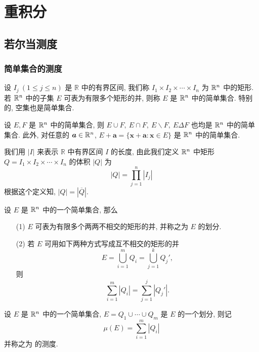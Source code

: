 \newpage
\chapter{重积分}

\section{若尔当测度}

\subsection{简单集合的测度}

\begin{definition}
	设 $I_j\ (1 \leqslant j \leqslant n)$ 是 $\mathbb R$ 中的有界区间, 我们称 $I_1\times I_2\times\cdots \times I_n$ 为 $\mathbb {R}^{n}$ 中的矩形. 若 $\mathbb {R}^{n}$ 中的子集 $E$ 可表为有限多个矩形的并, 则称 $E$ 是 $\mathbb {R}^{n}$ 中的简单集合. 特别的, 空集也是简单集合.
\end{definition}

\begin{proposition}
	设 $E,F$ 是 $\mathbb {R}^{n}$ 中的简单集合, 则 $E\cup F,\ E \cap F, \ E\backslash F,\ E\Delta F$ 也均是 $\mathbb {R}^{n}$ 中的简单集合. 此外, 对任意的 $\bm a \in \mathbb {R}^{n}$, $E+\bm a=\{\bm x +\bm a:\bm x \in E\}$ 是 $\mathbb {R}^{n}$ 中的简单集合.
\end{proposition}

\begin{definition}
	我们用 $|I|$ 来表示 $\mathbb R$ 中有界区间 $I$ 的长度, 由此我们定义 $\mathbb {R}^{n}$ 中矩形 $Q=I_1\times I_2\times\cdots\times I_n$ 的体积 $|Q|$ 为 $$|Q|=\prod\limits_{j=1}^n |I_j|$$ 根据这个定义知, $|Q|=|\overline{Q}|$.
\end{definition}

\begin{proposition}
	设 $E$ 是 $\mathbb {R}^{n}$ 中的一个简单集合, 那么
	
	\begin{itemize}[leftmargin=1.5cm]
		\item[(1)]  $E$ 可表为有限多个两两不相交的矩形的并, 并称之为 $E$ 的划分.
		\item[(2)]  若 $E$ 可用如下两种方式写成互不相交的矩形的并
		$$E=\bigcup\limits_{i=1}^m Q_i=\bigcup\limits_{j=1}^k Q_j',$$
		则
		$$\sum\limits_{i=1}^m |Q_i|=\sum\limits_{j=1}^j |Q_j'|.$$ 
	\end{itemize}
\end{proposition}

\begin{definition}
	设 $E$ 是 $\mathbb {R}^{n}$ 中的一个简单集合, $E=Q_1\cup \cdots \cup Q_m$ 是 $E$ 的一个划分, 则记 $$\mu(E)=\sum\limits_{i=1}^m|Q_i|$$ 并称之为  的测度.
\end{definition}

